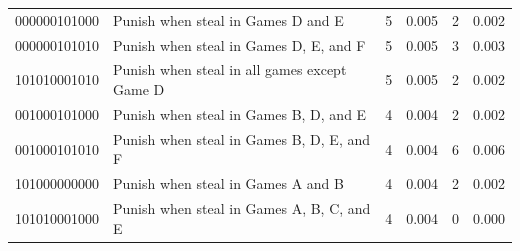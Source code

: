 \documentclass[
  man,floatsintext]{apa6}
\begin{document}
\begin{table}[H]
\begin{center}
\begin{threeparttable}
{\begin{tabular}{llcccc}
000000101000 & Punish when steal in Games D and E & 5 & 0.005 & 2 & 0.002\\
000000101010 & Punish when steal in Games D, E, and F & 5 & 0.005 & 3 & 0.003\\
101010001010 & Punish when steal in all games except Game D & 5 & 0.005 & 2 & 0.002\\
001000101000 & Punish when steal in Games B, D, and E & 4 & 0.004 & 2 & 0.002\\
001000101010 & Punish when steal in Games B, D, E, and F & 4 & 0.004 & 6 & 0.006\\
101000000000 & Punish when steal in Games A and B & 4 & 0.004 & 2 & 0.002\\
101010001000 & Punish when steal in Games A, B, C, and E & 4 & 0.004 & 0 & 0.000\\
\bottomrule
\end{tabular}

}

\end{threeparttable}
\end{center}

\end{table}

\newpage
\end{document}
